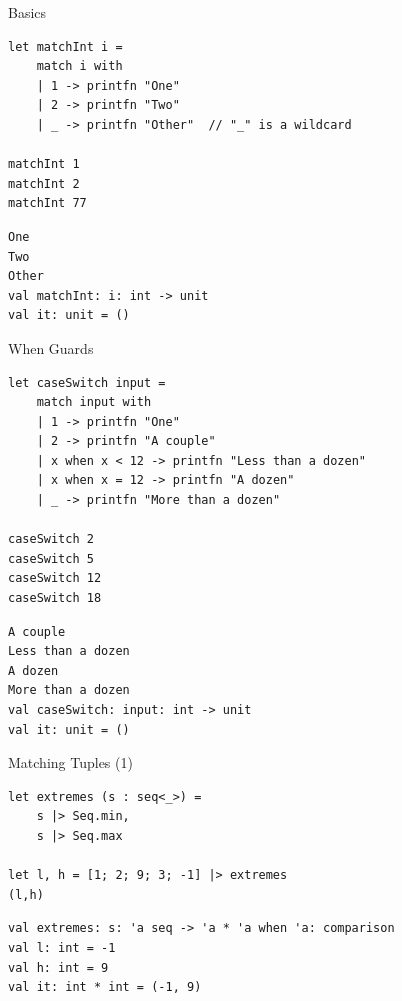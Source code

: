 \documentclass[t]{beamer}
\begin{document}
\begin{frame}[label={sec:org589ae59},fragile]{Basics}
 \begin{verbatim}
let matchInt i =
    match i with
    | 1 -> printfn "One"
    | 2 -> printfn "Two"
    | _ -> printfn "Other"  // "_" is a wildcard

matchInt 1
matchInt 2
matchInt 77
\end{verbatim}

\begin{verbatim}
One
Two
Other
val matchInt: i: int -> unit
val it: unit = ()
\end{verbatim}
\end{frame}

\begin{frame}[label={sec:org10a8335},fragile]{When Guards}
 \begin{verbatim}
let caseSwitch input =
    match input with
    | 1 -> printfn "One"
    | 2 -> printfn "A couple"
    | x when x < 12 -> printfn "Less than a dozen" 
    | x when x = 12 -> printfn "A dozen"
    | _ -> printfn "More than a dozen"

caseSwitch 2
caseSwitch 5
caseSwitch 12
caseSwitch 18
\end{verbatim}

\begin{verbatim}
A couple
Less than a dozen
A dozen
More than a dozen
val caseSwitch: input: int -> unit
val it: unit = ()
\end{verbatim}
\end{frame}

\begin{frame}[label={sec:org20c4c2a},fragile]{Matching Tuples (1)}
 \begin{verbatim}
let extremes (s : seq<_>) = 
    s |> Seq.min,
    s |> Seq.max

let l, h = [1; 2; 9; 3; -1] |> extremes
(l,h)
\end{verbatim}

\begin{verbatim}
val extremes: s: 'a seq -> 'a * 'a when 'a: comparison
val l: int = -1
val h: int = 9
val it: int * int = (-1, 9)
\end{verbatim}
\end{frame}
\end{document}
